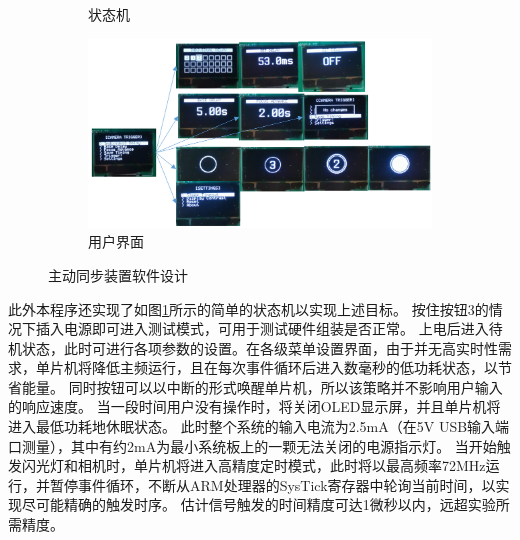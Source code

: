 \begin{figure}
\centering
\begin{subfigure}[b]{.41\textwidth}
    \caption{状态机}
    \label{fig:active_sync_states}
\end{subfigure}%
\begin{subfigure}[b]{.59\textwidth}
    \includegraphics[width=\textwidth]{figures/active_sync_ui}
    \caption{用户界面}
    \label{fig:active_sync_ui}
\end{subfigure}%
\caption{主动同步装置软件设计}
\end{figure}
此外本程序还实现了如图\ref{fig:active_sync_states}所示的简单的状态机以实现上述目标。
按住按钮3的情况下插入电源即可进入测试模式，可用于测试硬件组装是否正常。
上电后进入待机状态，此时可进行各项参数的设置。在各级菜单设置界面，由于并无高实时性需求，单片机将降低主频运行，且在每次事件循环后进入数毫秒的低功耗状态，以节省能量。
同时按钮可以以中断的形式唤醒单片机，所以该策略并不影响用户输入的响应速度。
当一段时间用户没有操作时，将关闭OLED显示屏，并且单片机将进入最低功耗地休眠状态。
此时整个系统的输入电流为2.5mA（在5V USB输入端口测量），其中有约2mA为最小系统板上的一颗无法关闭的电源指示灯。
当开始触发闪光灯和相机时，单片机将进入高精度定时模式，此时将以最高频率72MHz运行，并暂停事件循环，不断从ARM处理器的SysTick寄存器中轮询当前时间，以实现尽可能精确的触发时序。
估计信号触发的时间精度可达1微秒以内，远超实验所需精度。

